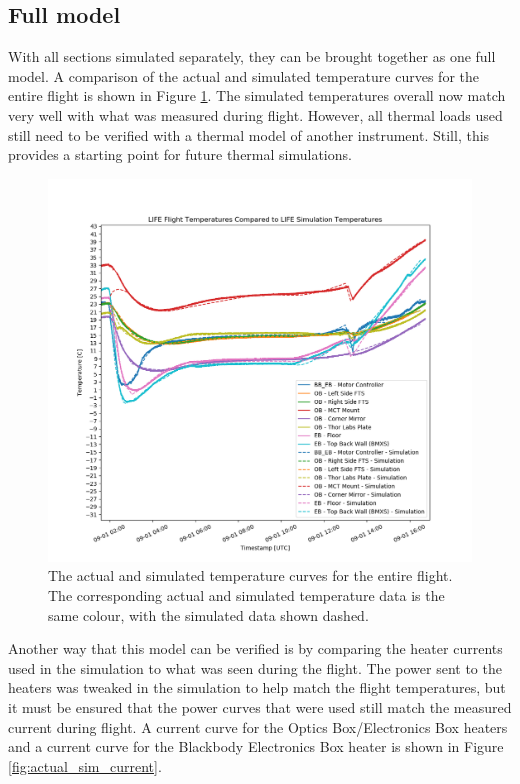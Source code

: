 \subsection{Full model}\label{full_temp_model}
With all sections simulated separately, they can be brought together as one full model. A comparison of the actual and simulated temperature curves for the entire flight is shown in Figure \ref{fig:full_flight_temps_with_sim}. The simulated temperatures overall now match very well with what was measured during flight. However, all thermal loads used still need to be verified with a thermal model of another instrument. Still, this provides a starting point for future thermal simulations.

\begin{figure}
    \centering
    \includegraphics[width=\textwidth]{chap4_images/Flight_temps_full_flight.png}
    \caption{The actual and simulated temperature curves for the entire flight. The corresponding actual and simulated temperature data is the same colour, with the simulated data shown dashed.}
    \label{fig:full_flight_temps_with_sim}
\end{figure}

Another way that this model can be verified is by comparing the heater currents used in the simulation to what was seen during the flight. The power sent to the heaters was tweaked in the simulation to help match the flight temperatures, but it must be ensured that the power curves that were used still match the measured current during flight. A current curve for the Optics Box/Electronics Box heaters and a current curve for the Blackbody Electronics Box heater is shown in Figure \ref{fig:actual_sim_current}.


